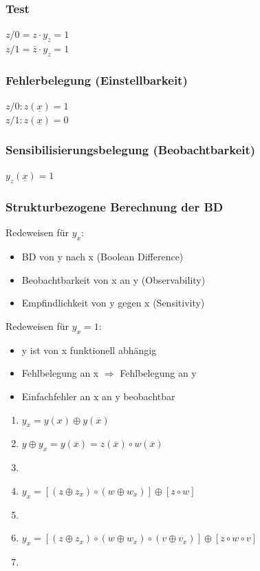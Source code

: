 \documentclass[a4paper,twocolumn,10pt]{article}
\begin{document}
\subsubsection*{Test}
$z/0=z\cdot y_z=1$\\
$z/1=\overline{z}\cdot y_z=1$

\subsubsection*{Fehlerbelegung (Einstellbarkeit)}
$z/0:z(\underline{x})=1$\\
$z/1:z(\underline{x})=0$

\subsubsection*{Sensibilisierungsbelegung (Beobachtbarkeit)}
$y_z(\underline{x})=1$

\subsubsection*{Strukturbezogene Berechnung der BD}
Redeweisen für $y_x$:
\begin{itemize}
	\item BD von y nach x (Boolean Difference)
	\item Beobachtbarkeit von x an y (Observability)
	\item Empfindlichkeit von y gegen x (Sensitivity)
\end{itemize}
Redeweisen für $y_x=1$:
\begin{itemize}
	\item y ist von x funktionell abhängig
	\item Fehlbelegung an x $\Rightarrow$ Fehlbelegung an y
	\item Einfachfehler an x an y beobachtbar
\end{itemize}

\begin{enumerate}[label=,leftmargin=0mm]
	\item $y_x=y(x)\oplus y(\overline{x})$
	\item $y\oplus y_x=y(\overline{x})=z(\overline{x}) \circ w(\overline{x})$
	\item {}
	\item $y_x=\left[(z\oplus z_x) \circ (w\oplus w_x)\right]\oplus\left[z\circ w\right]$
	\item {}
	\item $y_x=\left[(z\oplus z_x) \circ (w\oplus w_x) \circ (v\oplus v_x)\right]\oplus\left[z\circ w\circ v\right]$
	\item 
\end{enumerate}
\end{document}

